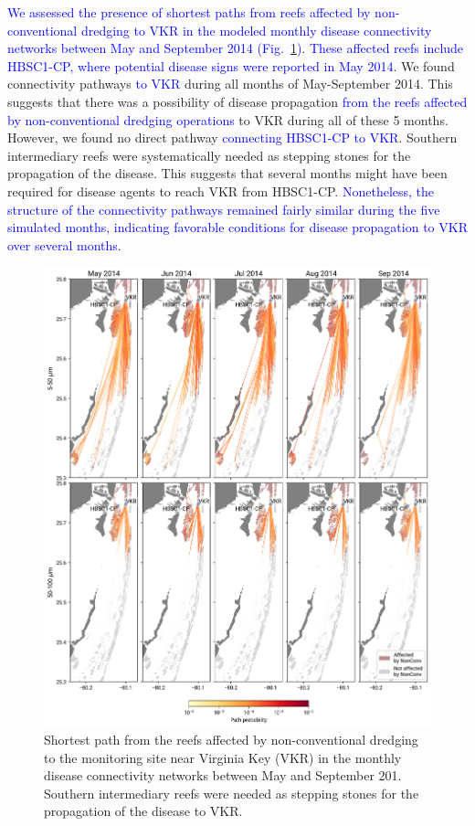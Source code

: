 \documentclass[preprint,12pt,authoryear]{elsarticle}
\newcommand{\modif}[1]{\textcolor{blue}{#1}}
\begin{document}
\modif{We assessed the presence of shortest paths from reefs affected by non-conventional dredging to VKR in the modeled monthly disease connectivity networks between May and September 2014 (Fig.~\ref{fig:onset_path})}. \modif{These affected reefs include HBSC1-CP, where potential disease signs were reported in May 2014}. We found connectivity pathways \modif{to VKR} during all months of May-September 2014. This suggests that there was a possibility of disease propagation \modif{from the reefs affected by non-conventional dredging operations} to VKR during all of these 5 months. However, we found no direct pathway \modif{connecting HBSC1-CP to VKR}. Southern intermediary reefs were systematically needed as stepping stones for the propagation of the disease. This suggests that several months might have been required for disease agents to reach VKR from HBSC1-CP. \modif{Nonetheless, the structure of the connectivity pathways remained fairly similar during the five simulated months, indicating favorable conditions for disease propagation to VKR over several months.}

\begin{figure}
	\centering
	\includegraphics[width=\textwidth]{figures/figure_new_shortest_paths.png}
    \caption{Shortest path from the reefs affected by non-conventional dredging to the monitoring site near Virginia Key (VKR) in the monthly disease connectivity networks between May and September 201. Southern intermediary reefs were needed as stepping stones for the propagation of the disease to VKR.}
	\label{fig:onset_path}
\end{figure}
\end{document}
